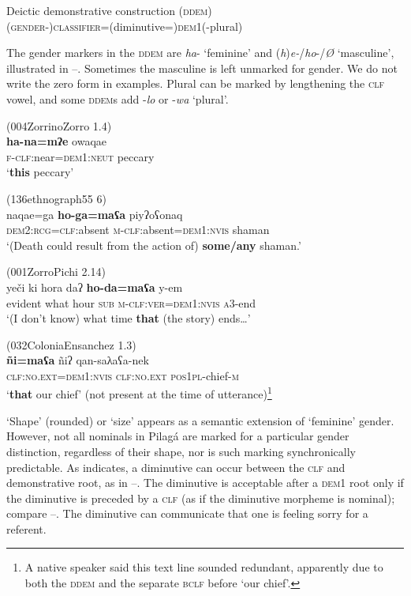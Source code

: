 \documentclass[output=paper,colorlinks,citecolor=brown]{langscibook}
\begin{document}
\ea\label{ex:payne:24}
Deictic demonstrative construction (\textsc{ddem})\\
(\textsc{gender}-)\textsc{classifier=}(diminutive=)\textsc{dem1}(-plural)\\
\z

The gender markers in the \textsc{ddem} are \textit{ha}- ‘feminine’ and (\textit{h})\textit{e-}/\textit{ho}-/\textit{Ø} ‘masculine’, illustrated in –. Sometimes the masculine is left unmarked for gender. We do not write the zero form in examples. Plural can be marked by lengthening the \textsc{clf} vowel, and some \textsc{ddem}s add -\textit{lo} or -\textit{wa} ‘plural’.

\ea\label{ex:payne:25} (004ZorrinoZorro 1.4)\\
\gll  \textbf{ha-na=mʔe}  owaqae\\
\textsc{f-clf}:near=\textsc{dem1:neut} peccary\\
\glt ‘\textbf{this} peccary’ 
\z

\ea\label{ex:payne:26} (136ethnograph55 6)\\
\gll  naqae=ga    \textbf{ho-ga=maʕa}  piyʔoʕonaq\\
\textsc{dem2:rcg=clf}:absent \textsc{m-clf}:absent=\textsc{dem1:nvis} shaman\\
\glt ‘(Death could result from the action of) \textbf{some/any} shaman.’ 
\z

\ea\label{ex:payne:27} (001ZorroPichi 2.14)\\
\gll  yeči  ki  hora  daʔ  \textbf{ho-da=maʕa}  y-em\\
 evident what hour \textsc{sub} \textsc{m-clf:ver=dem1:nvis}  \textsc{a3}-end\\
\glt ‘(I don’t know) what time \textbf{that} (the story) ends…’ 
\z

\ea\label{ex:payne:28} (032ColoniaEnsanchez 1.3)\\
\gll  \textbf{ñi=maʕa}  ñiʔ  qan-saλaʕa-nek\\
 \textsc{clf:no.ext=dem1:nvis}  \textsc{clf:no.ext}  \textsc{pos1pl}-chief-\textsc{m}\\
\glt ‘\textbf{that} our chief’ (not present at the time of utterance)\footnote{A native speaker said this text line sounded redundant, apparently due to both the \textsc{ddem} and the separate \textsc{bclf} before ‘our chief’.} 
\z

‘Shape’ (rounded) or ‘size’  appears as a semantic extension of ‘feminine’ gender. However, not all nominals in Pilagá are marked for a particular gender distinction, regardless of their shape, nor is such marking synchronically predictable. As  indicates, a diminutive can occur between the \textsc{clf} and demonstrative root, as in –. The diminutive is acceptable after a \textsc{dem1} root only if the diminutive is preceded by a \textsc{clf} (as if the diminutive morpheme is nominal); compare –. The diminutive can communicate that one is feeling sorry for a referent.
\end{document}
